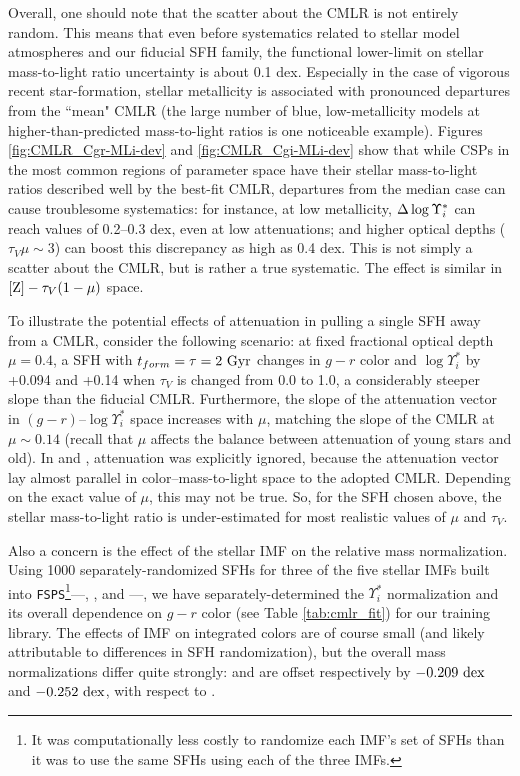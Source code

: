 Overall, one should note that the scatter about the CMLR is not entirely random. This means that even before systematics related to stellar model atmospheres and our fiducial SFH family, the functional lower-limit on stellar mass-to-light ratio uncertainty is about 0.1 dex. Especially in the case of vigorous recent star-formation, stellar metallicity is associated with pronounced departures from the ``mean" CMLR (the large number of blue, low-metallicity models at higher-than-predicted mass-to-light ratios is one noticeable example). Figures \ref{fig:CMLR_Cgr-MLi-dev} and \ref{fig:CMLR_Cgi-MLi-dev} show that while CSPs in the most common regions of parameter space have their stellar mass-to-light ratios described well by the best-fit CMLR, departures from the median case can cause troublesome systematics: for instance, at low metallicity, $\Delta \log \Upsilon^*_{i}$ can reach values of 0.2--0.3 dex, even at low attenuations; and higher optical depths ($\tau_V \mu \sim 3$) can boost this discrepancy as high as 0.4 dex. This is not simply a scatter about the CMLR, but is rather a true systematic. The effect is similar in ${\rm [Z]}-\tau_V (1 - \mu)$ space.

To illustrate the potential effects of attenuation in pulling a single SFH away from a CMLR, consider the following scenario: at fixed fractional optical depth $\mu = 0.4$, a SFH with $t_{form} = \tau = 2~{\rm Gyr}$ changes in $g-r$ color and $\log \Upsilon^*_i$ by +0.094 and +0.14 when $\tau_V$ is changed from 0.0 to 1.0, a considerably steeper slope than the fiducial CMLR. Furthermore, the slope of the attenuation vector in $(g-r)$--$\log \Upsilon^*_i$ space increases with $\mu$, matching the slope of the CMLR at $\mu \sim 0.14$ (recall that $\mu$ affects the balance between attenuation of young stars and old). In \citet{bell_dejong_01} and \citet{bell_03}, attenuation was explicitly ignored, because the attenuation vector lay almost parallel in color--mass-to-light space to the adopted CMLR. Depending on the exact value of $\mu$, this may not be true. So, for the SFH chosen above, the stellar mass-to-light ratio is under-estimated for most realistic values of $\mu$ and $\tau_V$.

Also a concern is the effect of the stellar IMF on the relative mass normalization. Using 1000 separately-randomized SFHs for three of the five stellar IMFs built into \texttt{FSPS}\footnote{It was computationally less costly to randomize each IMF's set of SFHs than it was to use the same SFHs using each of the three IMFs.}---\citet{salpeter_imf_55}, \citet{chabrier03}, and \citet{kroupa_imf_01}---, we have separately-determined the $\Upsilon^*_i$ normalization and its overall dependence on $g-r$ color (see Table \ref{tab:cmlr_fit}) for our training library. The effects of IMF on integrated colors are of course small (and likely attributable to differences in SFH randomization), but the overall mass normalizations differ quite strongly: \citet{kroupa_imf_01} and \citet{chabrier03} are offset respectively by $-0.209~{\rm dex}$ and $-0.252~{\rm dex}$, with respect to \citet{salpeter_imf_55}.

